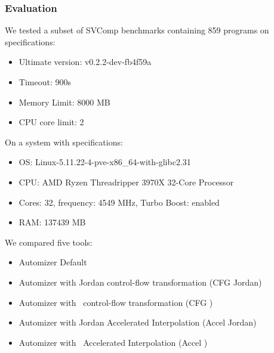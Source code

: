 \begin{frame}[t]
	\frametitle{Evaluation}
		We tested a subset of SVComp benchmarks containing 859 programs on specifications: \\
		\begin{itemize}
			\item Ultimate version: v0.2.2-dev-fb4f59a \\
			\item Timeout: 900s \\
			\item Memory Limit: 8000 MB\\
			\item CPU core limit: 2
		\end{itemize} \vspace*{0.25cm}
		On a system with specifications:
		\begin{itemize}
			\item OS: Linux-5.11.22-4-pve-x86\_64-with-glibc2.31 \\
			\item CPU: AMD Ryzen Threadripper 3970X 32-Core Processor \\
			\item Cores: 32, frequency: 4549 MHz, Turbo Boost: enabled \\
			\item RAM: 137439 MB
		\end{itemize} \vspace*{0.25cm}
	We compared five tools:
	\begin{itemize}
		\item Automizer Default \\
		\item Automizer with Jordan control-flow transformation (\color{emblue}CFG Jordan\color{black}) \\
		\item Automizer with \qvasr\ control-flow transformation (\color{emblue}CFG \qvasr\color{black})\\
		\item Automizer with Jordan Accelerated Interpolation (\color{emblue}Accel Jordan\color{black}) \\
		\item Automizer with \qvasr\ Accelerated Interpolation (\color{emblue}Accel \qvasr\color{black}) \\
	\end{itemize}
\end{frame}

